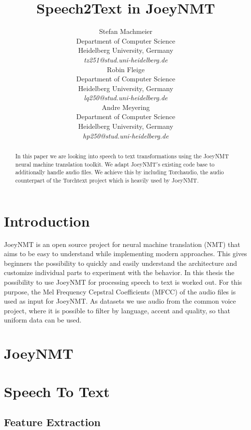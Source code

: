 \documentclass[11pt,a4paper]{article}
\title{Speech2Text in JoeyNMT}
\author{\small Stefan Machmeier \\
  \small Department of Computer Science \\
  \small Heidelberg University, Germany \\
  \small \textit{tz251@stud.uni-heidelberg.de} \\
  \And
  \small Robin Fleige \\
  \small Department of Computer Science \\
  \small Heidelberg University, Germany \\
  \small \textit{lq250@stud.uni-heidelberg.de} \\
  \And
  \small Andre Meyering \\
  \small Department of Computer Science \\
  \small Heidelberg University, Germany \\
  \small \textit{hp250@stud.uni-heidelberg.de} \\}
\date{}
\begin{document}
\maketitle
\begin{abstract}

In this paper we are looking into speech to text transformations using the JoeyNMT neural machine translation toolkit.
We adapt JoeyNMT's existing code base to additionally handle audio files.
We achieve this by including Torchaudio, the audio counterpart of the Torchtext project which is heavily used by JoeyNMT.

\end{abstract}

\section{Introduction}

JoeyNMT is an open source project for neural machine
translation (NMT) that aims to be easy to understand while implementing modern approaches. This gives beginners the possibility to quickly and easily understand the architecture and customize individual parts to experiment with the behavior.
In this thesis the possibility to use JoeyNMT for processing speech to text is worked out. For this purpose, the Mel Frequency Cepstral Coefficients (MFCC) of the audio files is used as input for JoeyNMT. As datasets we use audio from the common voice project, where it is possible to filter by language, accent and quality, so that uniform data can be used.


\section{JoeyNMT}


\section{Speech To Text}


\subsection{Feature Extraction}

\end{document}
